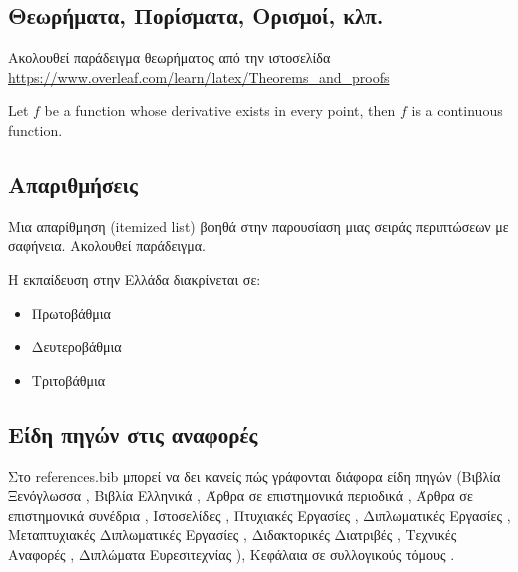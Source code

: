 \subsection{Θεωρήματα, Πορίσματα, Ορισμοί, κλπ.}

Ακολουθεί παράδειγμα θεωρήματος από την ιστοσελίδα  {\small\url{https://www.overleaf.com/learn/latex/Theorems_and_proofs}}

\begin{theorem}
Let $f$ be a function whose derivative exists in every point, then $f$ 
is a continuous function.
\end{theorem}

\subsection{Απαριθμήσεις}

Μια απαρίθμηση (itemized list) βοηθά στην παρουσίαση μιας σειράς περιπτώσεων με σαφήνεια.
Ακολουθεί παράδειγμα.

H εκπαίδευση στην Ελλάδα διακρίνεται σε:
\begin{itemize}
\item Πρωτοβάθμια 
\item Δευτεροβάθμια 
\item Τριτοβάθμια 
\end{itemize}

\subsection{Είδη πηγών στις αναφορές}

Στο references.bib μπορεί να δει κανείς πώς γράφονται διάφορα είδη πηγών 
(Βιβλία Ξενόγλωσσα \cite{goossens93},
Βιβλία Ελληνικά \cite{greekbook},
Άρθρα σε επιστημονικά περιοδικά \cite{LiArTs13},
Άρθρα σε επιστημονικά συνέδρια \cite{dcis2011},
Ιστοσελίδες \cite{LaTeXProject},
Πτυχιακές Εργασίες \cite{elli05},
Διπλωματικές Εργασίες \cite{zoi04},
Μεταπτυχιακές Διπλωματικές Εργασίες \cite{master04},
Διδακτορικές Διατριβές \cite{phd045},
Τεχνικές Αναφορές \cite{MSU-CSE-05-29},
Διπλώματα Ευρεσιτεχνίας \cite{viswanathan2014convenient}),
Κεφάλαια σε συλλογικούς τόμους
\cite{[PS11]}.

